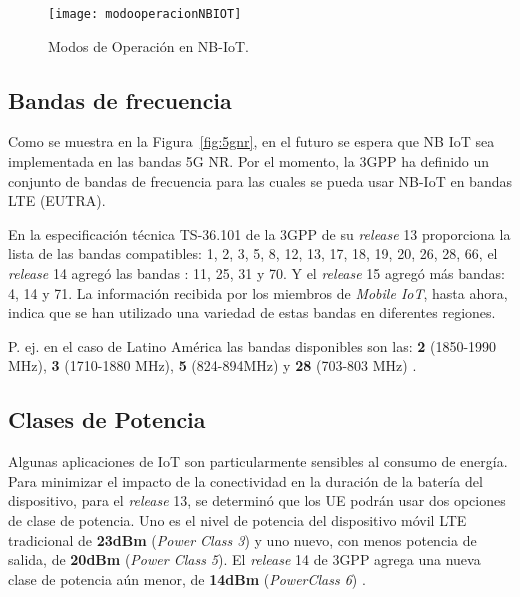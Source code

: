 \begin{figure}[th]
    \centering
    \texttt{[image: modooperacionNBIOT]}
    \decoRule
    \caption[Modos de Operación en NB-IoT.]{Modos de Operación en NB-IoT. \parencite{Liberg2018}}
    \label{fig:NBIoT2}
\end{figure}

\subsection{Bandas de frecuencia}

Como se muestra en la Figura~\ref{fig:5gnr}, en el futuro se espera que NB IoT sea implementada en las bandas 5G NR. Por el momento, la 3GPP ha definido un conjunto de bandas de frecuencia para las cuales se pueda usar NB-IoT en bandas LTE (EUTRA). \newline

En la especificación técnica TS-36.101 de la 3GPP de su \textit{release} 13 proporciona la lista de las bandas compatibles: 1, 2, 3, 5, 8, 12, 13, 17, 18, 19, 20, 26, 28, 66, el \textit{release} 14 agregó las bandas : 11, 25, 31 y 70. Y el \textit{release} 15 agregó más bandas: 4, 14 y 71. La información recibida por los miembros de \textit{Mobile IoT}, hasta ahora, indica que se han utilizado una variedad de estas bandas en diferentes regiones\parencite{NBIoTDeploymentGSMA}.\newline

P. ej. en el caso de Latino América las bandas disponibles son las: \textbf{2} (1850-1990 MHz), \textbf{3} (1710-1880 MHz), \textbf{5} (824-894MHz) y \textbf{28} (703-803 MHz) \parencite{NBIoTDeploymentGSMA}.

\subsection{Clases de Potencia}

Algunas aplicaciones de IoT son particularmente sensibles al consumo de energía. Para minimizar el impacto de la conectividad en la duración de la batería del dispositivo, para el \textit{release} 13, se determinó que los UE podrán usar dos opciones de clase de potencia. Uno es el nivel de potencia del dispositivo móvil LTE tradicional de \textbf{23dBm} (\textit{Power Class 3}) y uno nuevo, con menos potencia de salida, de \textbf{20dBm} (\textit{Power Class 5}). El \textit{release} 14 de 3GPP agrega una nueva clase de potencia aún menor, de \textbf{14dBm} (\textit{PowerClass 6}) \parencite{NBIoTDeploymentGSMA}.

